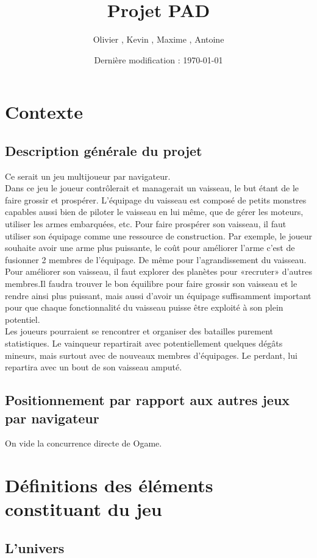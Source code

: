 \documentclass[a4paper,11pt]{report}
\title{Projet PAD}
\author{Olivier \bsc{Boissard}, Kevin \bsc{Boulala}, Maxime \bsc{Dubois}, Antoine \bsc{Lavier}}
\date{Dernière modification : \today}
\begin{document}
\maketitle
\tableofcontents

\chapter{Contexte}
    \section{Description générale du projet}
    Ce serait un jeu multijoueur par navigateur.\\
    Dans ce jeu le joueur contrôlerait et managerait un vaisseau, le but étant de le faire grossir et prospérer.
    L’équipage du vaisseau est composé de petits monstres capables aussi bien de piloter le vaisseau en lui même, que de gérer les moteurs, utiliser les armes embarquées, etc. Pour faire prospérer son vaisseau, il faut utiliser son équipage comme une ressource de construction. Par exemple, le joueur souhaite avoir une arme plus puissante, le coût pour améliorer l’arme c’est de fusionner 2 membres de l’équipage. De même pour l’agrandissement du vaisseau.\\
    Pour améliorer son vaisseau, il faut explorer des planètes pour «recruter» d’autres membres.Il faudra trouver le bon équilibre pour faire grossir son vaisseau et le rendre ainsi plus puissant, mais aussi d’avoir un équipage suffisamment important pour que chaque fonctionnalité du vaisseau puisse être exploité à son plein potentiel.\\
    Les joueurs pourraient se rencontrer et organiser des batailles purement statistiques. Le vainqueur repartirait avec potentiellement quelques dégâts mineurs, mais surtout avec de nouveaux membres d’équipages. Le perdant, lui repartira avec un bout de son vaisseau amputé.

    \section{Positionnement par rapport aux autres jeux par navigateur}
    On vide la concurrence directe de Ogame.

\chapter{Définitions des éléments constituant du jeu}
    \section{L'univers}
\end{document}
